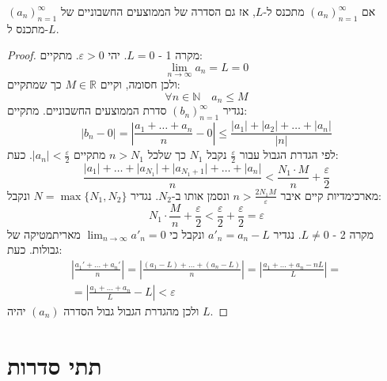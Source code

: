 \documentclass{tstextbook}
\begin{document}
\begin{theorem}[צ'סרו]
אם \((a_n)_{n=1}^\infty\) מתכנס ל-\(L\), אז גם הסדרה של הממוצעים החשבוניים של \((a_n)_{n=1}^\infty\) מתכנס ל-\(L\).

\end{theorem}
\begin{proof}
מקרה 1 - \(L=0\). יהי \(\varepsilon>0\). מתקיים:
$$\lim_{ n \to \infty } a_{n}=L=0$$
ולכן חסומה, וקיים \(M \in \mathbb{R}\) כך שמתקיים:
$$\forall n \in \mathbb{N}\quad a_{n}\leq M$$
נגדיר \((b_n)_{n=1}^\infty\) סדרת הממוצעים החשבוניים. מתקיים:
$$\lvert b_{n}-0 \rvert =\left\lvert   \frac{a_{1}+\dots+a_{n}}{n}-0  \right\rvert \leq \frac{\lvert a_{1} \rvert +\left\lvert  a_{2}  \right\rvert + \dots +\lvert a_{n} \rvert }{\lvert n \rvert }$$
לפי הגדרת הגבול עבור \(\frac{\varepsilon}{2}\) נקבל \(N_{1}\) כך שלכל \(n> N_{1}\) מתקיים \(\lvert a_{n} \rvert<\frac{\varepsilon}{2}\). כעת:
$$\frac{\lvert a_{1} \rvert +\dots+\lvert a_{N_{1}} \rvert +\lvert a_{N_{1}+1} \rvert +\dots+\lvert a_{n} \rvert}{n}< \frac{N_{1}\cdot M }{n}+\frac{\varepsilon}{2} $$
מארכימדיות קיים איבר \(n> \frac{2N_{1}M}{\varepsilon}\) ונסמן אותו ב-\(N_{2}\). נגדיר \(N=\max\{ N_{1},N_{2} \}\) ונקבל:
$$N_{1}\cdot \frac{M}{n}+\frac{\varepsilon}{2}<\frac{\varepsilon}{2}+\frac{\varepsilon}{2}=\varepsilon$$
מקרה 2 - \(L\neq 0\). נגדיר \(a'_{n}=a_{n}-L\) ונקבל כי \(\lim_{ n \to \infty }a'_{n}=0\) מאריתמטיקה של גבולות. כעת:
\begin{gather*}\left\lvert  \frac{a_{1}'+\dots+a_{n}'}{n}  \right\rvert =\left\lvert  \frac{(a_{1}-L)+\dots+(a_{n}-L) }{n} \right\rvert =\left\lvert  \frac{a_{1}+\dots+a_{n}-nL}{L}  \right\rvert = \\=\left\lvert  \frac{a_{1}+\dots+a_{n}}{L}-L   \right\rvert   <\varepsilon
\end{gather*}
ולכן מהגדרת הגבול גבול הסדרה \((a_{n})\) יהיה \(L\).

\end{proof}
\section{תתי סדרות}
\end{document}
